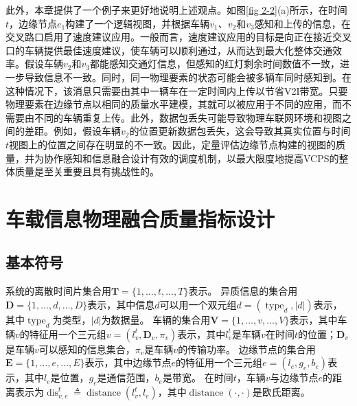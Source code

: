 此外，本章提供了一个例子来更好地说明上述观点。如图\ref{fig 2-2}(a)所示，在时间 $t$，边缘节点$e_1$构建了一个逻辑视图，并根据车辆$v_1$、$v_2$和$v_3$感知和上传的信息，在交叉路口启用了速度建议应用。一般而言，速度建议应用的目标是向正在接近交叉口的车辆提供最佳速度建议，使车辆可以顺利通过，从而达到最大化整体交通效率。假设车辆$v_2$和$v_3$都能感知交通灯信息，但感知的红灯剩余时间数值不一致，进一步导致信息不一致。同时，同一物理要素的状态可能会被多辆车同时感知到。在这种情况下，该消息只需要由其中一辆车在一定时间内上传以节省V2I带宽。只要物理要素在边缘节点以相同的质量水平建模，其就可以被应用于不同的应用，而不需要由不同的车辆重复上传。此外，数据包丢失可能导致物理车联网环境和视图之间的差距。例如，假设车辆$v_2$的位置更新数据包丢失，这会导致其真实位置与时间$t$视图上的位置之间存在明显的不一致。因此，定量评估边缘节点构建的视图的质量，并为协作感知和信息融合设计有效的调度机制，以最大限度地提高VCPS的整体质量是至关重要且具有挑战性的。

\section{车载信息物理融合质量指标设计}\label{section 2-4}

\subsection{基本符号}

系统的离散时间片集合用$\mathbf{T}=\{1, \ldots, t, \ldots, T\}$表示。
异质信息的集合用$\mathbf{D}=\{1, \ldots, d, \ldots, D\}$表示，其中信息$d$可以用一个双元组$d=\left(\operatorname{type}_d, \left|d\right| \right)$表示，其中$\operatorname{type}_d$为类型，$\left|d\right|$为数据量。
车辆的集合用$\mathbf{V}=\{1, \ldots, v, \ldots, V\}$表示，其中车辆$v$的特征用一个三元组$v=\left (l_v^t, \mathbf{D}_v, \pi_v \right )$表示，其中$l_v^t$是车辆$v$在时间$t$的位置；$\mathbf{D}_v$是车辆$v$可以感知的信息集合，$\pi_v$是车辆$v$的传输功率。
边缘节点的集合用$\mathbf{E}=\{1, \ldots, e, \ldots, E\}$表示，其中边缘节点$e$的特征用一个三元组$e=\left (l_e, g_e, b_e \right)$表示，其中$l_e$是位置，$g_e$是通信范围，$b_e$是带宽。
在时间$t$，车辆$v$与边缘节点$e$的距离表示为$\operatorname{dis}_{v,e}^t \triangleq \operatorname{distance} \left (l_v^t, l_e \right )$，其中$\operatorname{distance}\left(\cdot,\cdot\right)$是欧氏距离。

